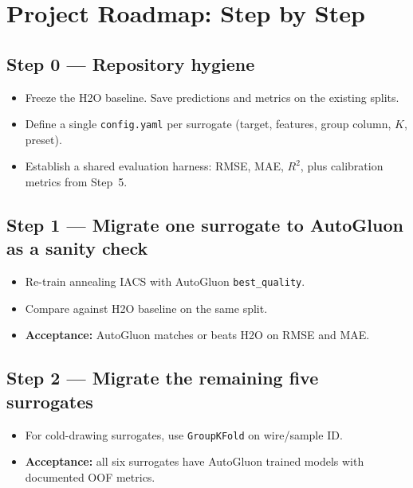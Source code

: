 \documentclass[11pt,a4paper]{article}
\begin{document}
\newpage
\section{Project Roadmap: Step by Step}
\label{sec:roadmap}

\subsection*{Step 0 --- Repository hygiene}
\begin{itemize}
    \item Freeze the H2O baseline. Save predictions and metrics on the existing splits.
    \item Define a single \texttt{config.yaml} per surrogate (target, features, group column, $K$, preset).
    \item Establish a shared evaluation harness: RMSE, MAE, $R^2$, plus calibration metrics from Step~5.
\end{itemize}

\subsection*{Step 1 --- Migrate one surrogate to AutoGluon as a sanity check}
\begin{itemize}
    \item Re-train annealing IACS with AutoGluon \texttt{best\_quality}.
    \item Compare against H2O baseline on the same split.
    \item \textbf{Acceptance:} AutoGluon matches or beats H2O on RMSE and MAE.
\end{itemize}

\subsection*{Step 2 --- Migrate the remaining five surrogates}
\begin{itemize}
    \item For cold-drawing surrogates, use \texttt{GroupKFold} on wire/sample ID.
    \item \textbf{Acceptance:} all six surrogates have AutoGluon trained models with documented OOF metrics.
\end{itemize}
\end{document}
